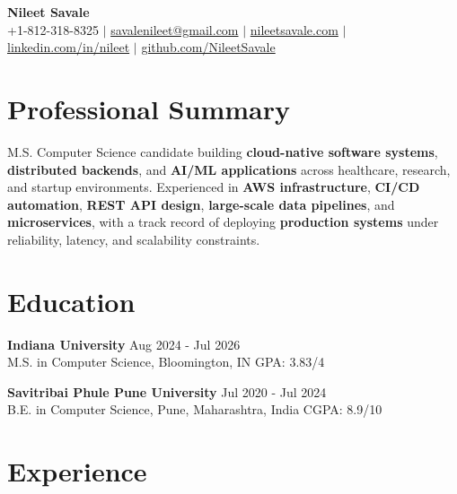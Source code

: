 \documentclass[letterpaper,8pt]{extarticle}
\begin{document}
\begin{center}
    {\Huge \textbf{Nileet Savale}} \\ \vspace{2pt}
    \small
    +1-812-318-8325 $|$
    \href{mailto:savalenileet@gmail.com}{\textcolor{linkblue}{savalenileet@gmail.com}} $|$
    \href{https://nileetsavale.com}{\textcolor{linkblue}{nileetsavale.com}} $|$
    \href{https://linkedin.com/in/nileet}{\textcolor{linkblue}{linkedin.com/in/nileet}} $|$
    \href{https://github.com/NileetSavale}{\textcolor{linkblue}{github.com/NileetSavale}}
\end{center}

\section{Professional Summary}
\vspace{3pt}

M.S. Computer Science candidate building \textbf{cloud-native software systems}, \textbf{distributed backends}, and \textbf{AI/ML applications} across healthcare, research, and startup environments. Experienced in \textbf{AWS infrastructure}, \textbf{CI/CD automation}, \textbf{REST API design}, \textbf{large-scale data pipelines}, and \textbf{microservices}, with a track record of deploying \textbf{production systems} under reliability, latency, and scalability constraints.

\section{Education}
\vspace{3pt}

\noindent\textbf{Indiana University} \hfill Aug 2024 - Jul 2026 \\
M.S. in Computer Science, Bloomington, IN \hfill GPA: 3.83/4

\vspace{3pt}

\noindent\textbf{Savitribai Phule Pune University} \hfill Jul 2020 - Jul 2024 \\
B.E. in Computer Science, Pune, Maharashtra, India \hfill CGPA: 8.9/10

\section{Experience}
\vspace{3pt}
\end{document}
